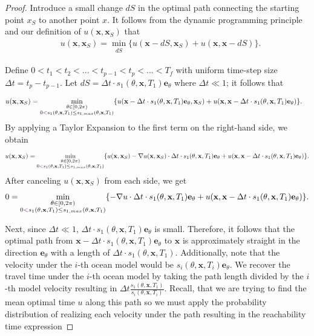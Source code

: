 \documentclass[10pt,a4paper]{amsart}
\def \be{{\mathbf {e}}}
\def \bx{{\mathbf {x}}}
\begin{document}
\begin{proof}

    Introduce a small change $dS$ in the optimal path connecting the starting point $x_S$ to another point $x$.  It follows from the dynamic programming principle and our definition of $u(\bx,\bx_S)$ that
    \begin{align*}
        &u(\bx,\bx_S) = \min\limits_{\substack{dS}}\{ u(\bx-dS,\bx_S) +  u(\bx,\bx-dS)\}.
    \end{align*}
    

    
    Define $0<t_1<t_2<...<t_{p-1}<t_p<...<T_f$ with uniform time-step size $\Delta t=t_p-t_{p-1}$.  Let $dS=\Delta t \cdot s_1(\theta,\bx,T_1)\be_\theta$ where $\Delta t \ll 1$; it follows that
    
    \begin{align*}
        &u(\bx,\bx_S) = \min\limits_{\substack{\theta \in [0,2\pi) \\ 0 {\color{violet} <} s_1(\theta,\bx,T_1) \leq s_{1,max}(\theta, \bx,T_1)}} \{ u(\bx-\Delta t \cdot s_1(\theta,\bx,T_1)\be_\theta, \bx_S) + u(\bx,\bx-\Delta t \cdot s_1(\theta,\bx,T_1)\be_\theta) \}.
    \end{align*}
    By applying a Taylor Expansion to the first term on the right-hand side, we obtain
    \begin{equation}
        u(\bx,\bx_S) = \min\limits_{\substack{\theta \in [0,2\pi) \\ 0 {\color{violet} <}  s_1(\theta,\bx,T_1) \leq s_{1,max}(\theta, \bx,T_1)}} \{ u(\bx,\bx_{S})- \nabla u(\bx,\bx_{S}) \cdot \Delta t \cdot s_1(\theta,\bx,T_1)\be_\theta + u(\bx,\bx-\Delta t \cdot s_1(\theta,\bx,T_1)\be_\theta)\}.
    \end{equation}
    After canceling $u(\bx,\bx_S)$ from each side, we get
    \begin{equation}
        0 = \min\limits_{\substack{\theta \in [0,2\pi) \\ 0 {\color{violet} <}  s_1(\theta,\bx,T_1) \leq s_{1,max}(\theta, \bx,T_1)}} \{ - \nabla u \cdot \Delta t \cdot s_1(\theta,\bx,T_1) \be_\theta + u(\bx,\bx-\Delta t \cdot s_1(\theta,\bx,T_1)\be_\theta)\}.
    \end{equation}


    Next, since $\Delta t\ll1$, $\Delta t \cdot s_1(\theta,\bx,T_1)\be_\theta$ is small.  Therefore, it follows that the optimal path from $\bx-\Delta t \cdot s_1(\theta,\bx,T_1)\be_\theta$ to $\bx$ is approximately straight in the direction $\be_\theta$ with a length of $\Delta t \cdot s_1(\theta,\bx,T_1)$.  Additionally, note that the velocity under the $i$-th ocean model would be $s_i(\theta,\bx,T_i)\be_\theta$.  We recover the travel time under the $i$-th ocean model by taking the path length divided by the $i$-th model velocity resulting in $\Delta t \frac{s_1(\theta,\bx,T_1)}{s_i(\theta,\bx,T_i)}$.  Recall, that we are trying to find the mean optimal time $u$ along this path so we must apply the probability distribution of realizing each velocity under the path resulting in the reachability time expression


\end{proof}
\end{document}
